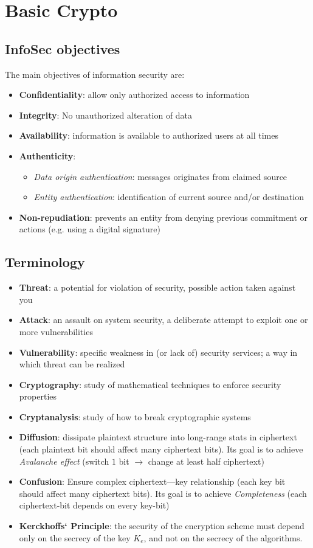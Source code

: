 \section{Basic Crypto}
\subsection{InfoSec objectives}
The main objectives of information security are:
\begin{itemize}
    \item \textbf{Confidentiality}: allow only authorized access to information
    \item \textbf{Integrity}: No unauthorized alteration of data
    \item \textbf{Availability}: information is available to authorized users at all times
    \item \textbf{Authenticity}: 
        \begin{itemize}
            \item \textit{Data origin authentication}: messages originates from claimed source
            \item \textit{Entity authentication}: identification of current source and/or destination
        \end{itemize}
    \item \textbf{Non-repudiation}: prevents an entity from denying previous commitment or actions (e.g. using a digital signature)
\end{itemize}
\subsection{Terminology}
\begin{itemize}
    \item \textbf{Threat}: a potential for violation of security, possible action taken against you
    \item \textbf{Attack}: an assault on system security, a deliberate attempt to exploit one or more vulnerabilities
    \item \textbf{Vulnerability}: specific weakness in (or lack of) security services; a way in which threat can be realized
    \item \textbf{Cryptography}: study of mathematical techniques to enforce security properties
    \item \textbf{Cryptanalysis}: study of how to break cryptographic systems
    \item \textbf{Diffusion}: dissipate plaintext structure into long-range stats in ciphertext (each plaintext bit should affect many ciphertext bits). Its goal is to achieve \textit{Avalanche effect} (switch $1$ bit $\rightarrow$ change at least half ciphertext)
    \item \textbf{Confusion}: Ensure complex ciphertext—key relationship (each key bit should affect many ciphertext bits). Its goal is to achieve \textit{Completeness} (each ciphertext-bit depends on every key-bit)
    \item \textbf{Kerckhoffs‘ Principle}: the security of the encryption scheme must depend only on the secrecy of the key $K_e$, and not on the secrecy of the algorithms.


\end{itemize}
